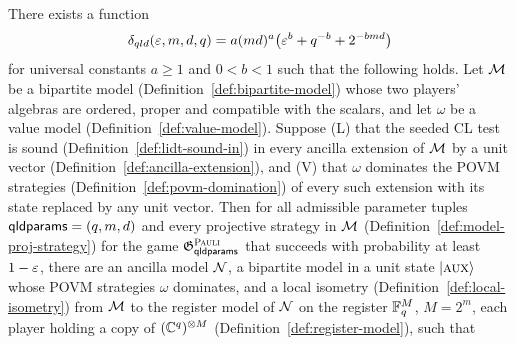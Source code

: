 \begin{theorem}
\label{thm:qld}
\leanok
There exists a function
\begin{equation*}
  \delta_{qld}(\eps, m, d, q) = a (md)^a \bigl( \eps^b + q^{-b} + 2^{-bmd} \bigr)
\end{equation*}
for universal constants $a \geq 1$ and $0 < b < 1$ such that the following holds. Let $\cal{M}$ be a
bipartite model (Definition~\ref{def:bipartite-model}) whose two players' algebras are ordered,
proper and compatible with the scalars, and let $\omega$ be a value model
(Definition~\ref{def:value-model}). Suppose (L) that the seeded CL test is sound
(Definition~\ref{def:lidt-sound-in}) in every ancilla extension of $\cal{M}$ by a unit vector
(Definition~\ref{def:ancilla-extension}), and (V) that $\omega$ dominates the POVM strategies
(Definition~\ref{def:povm-domination}) of every such extension with its state replaced by any unit
vector. Then for all admissible parameter tuples $\qldparams = (q, m, d)$ and every projective
strategy in $\cal{M}$ (Definition~\ref{def:model-proj-strategy}) for the game
$\game^{\pauli}_{\qldparams}$ that succeeds with probability at least $1 - \eps$, there are an
ancilla model $\cal{N}$, a bipartite model in a unit state $\ket{\aux}$ whose POVM strategies
$\omega$ dominates, and a local isometry (Definition~\ref{def:local-isometry}) from $\cal{M}$ to the
register model of $\cal{N}$ on the register $\F_q^M$, $M = 2^m$, each player holding a copy of
$(\C^q)^{\ot M}$ (Definition~\ref{def:register-model}), such that
\begin{enumerate}

\end{enumerate}
\end{theorem}
